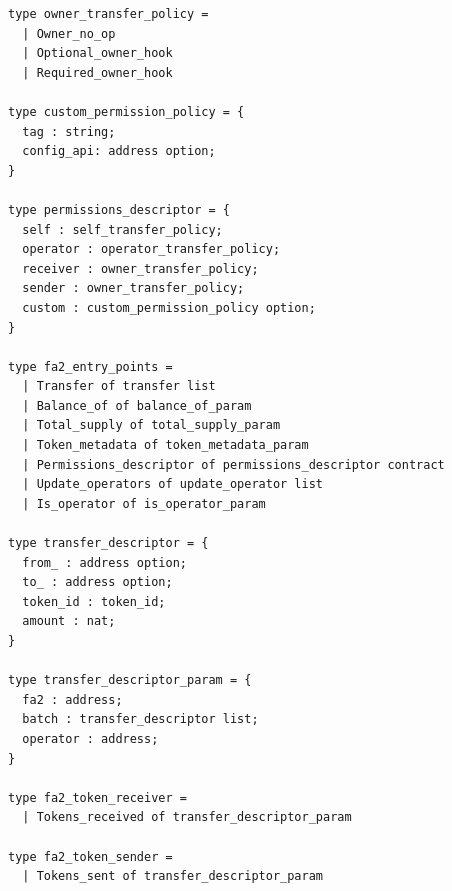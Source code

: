 \documentclass[twoside,11pt,openright]{report}
\begin{document}
\begin{verbatim}
type owner_transfer_policy =
  | Owner_no_op
  | Optional_owner_hook
  | Required_owner_hook

type custom_permission_policy = {
  tag : string;
  config_api: address option;
}

type permissions_descriptor = {
  self : self_transfer_policy;
  operator : operator_transfer_policy;
  receiver : owner_transfer_policy;
  sender : owner_transfer_policy;
  custom : custom_permission_policy option;
}

type fa2_entry_points =
  | Transfer of transfer list
  | Balance_of of balance_of_param
  | Total_supply of total_supply_param
  | Token_metadata of token_metadata_param
  | Permissions_descriptor of permissions_descriptor contract
  | Update_operators of update_operator list
  | Is_operator of is_operator_param

type transfer_descriptor = {
  from_ : address option;
  to_ : address option;
  token_id : token_id;
  amount : nat;
}

type transfer_descriptor_param = {
  fa2 : address;
  batch : transfer_descriptor list;
  operator : address;
}

type fa2_token_receiver =
  | Tokens_received of transfer_descriptor_param

type fa2_token_sender =
  | Tokens_sent of transfer_descriptor_param

\end{verbatim}
\end{document}
